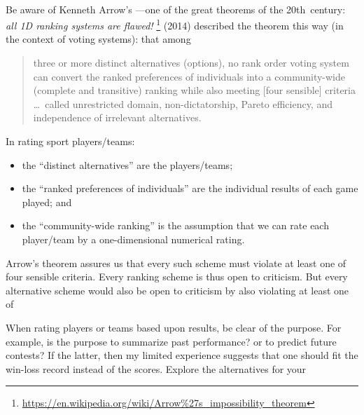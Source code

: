 \begin{table}
\begin{minipage}{\linewidth}
\hrulefill\\
Be aware of Kenneth Arrow's  \cite[]{Arrow50}---one of the great theorems of the 20th~century: \emph{all 1D ranking systems are flawed!}  
\footnote{\protect\url{https://en.wikipedia.org/wiki/Arrow\%27s\_impossibility\_theorem}}
 (2014) described the theorem this way (in the context of voting systems): that among 
\begin{quote}
three or more distinct alternatives (options), no rank order voting system can convert the ranked preferences of individuals into a community-wide (complete and transitive) ranking while also meeting [four sensible] criteria \ldots\ called unrestricted domain, non-dictatorship, Pareto efficiency, and independence of irrelevant alternatives.
\end{quote}
In rating sport players\slash teams:
\begin{itemize}
\item the ``distinct alternatives'' are the players\slash teams;
\item  the ``ranked preferences of individuals'' are the individual results of each game played; and 
\item the ``community-wide ranking'' is the assumption that we can rate each player\slash team by a one-dimensional numerical rating.
\end{itemize}
Arrow's theorem assures us that every such scheme must violate at least one of four sensible criteria.
Every ranking scheme is thus open to criticism. 
But every alternative scheme would also be open to criticism by also violating at least one of 
\end{minipage}
\end{table}


When rating players or teams based upon results, be clear of the purpose.  
For example, is the purpose to summarize past performance? or to predict future contests?  
If the latter, then my limited experience suggests that one should fit the win-loss record instead of the scores.
Explore the alternatives for your 

